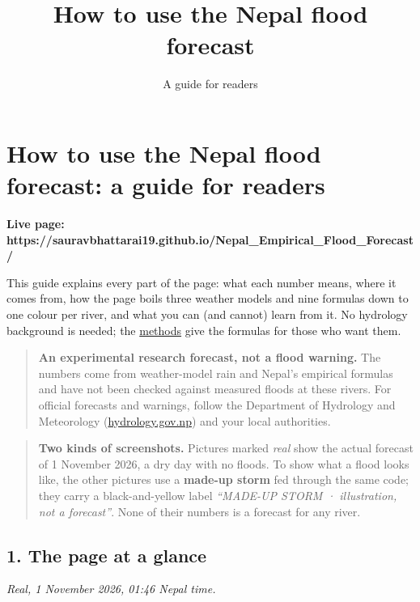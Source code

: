 \documentclass[
  10pt,
]{article}
\title{How to use the Nepal flood forecast}
\subtitle{A guide for readers}
\author{}
\date{}
\begin{document}
\maketitle

{
\hypersetup{linkcolor=}
\setcounter{tocdepth}{3}
\tableofcontents
}
\hypertarget{how-to-use-the-nepal-flood-forecast-a-guide-for-readers}{%
\section{How to use the Nepal flood forecast: a guide for
readers}\label{how-to-use-the-nepal-flood-forecast-a-guide-for-readers}}

\textbf{Live page:
https://sauravbhattarai19.github.io/Nepal\_Empirical\_Flood\_Forecast/}

This guide explains every part of the page: what each number means,
where it comes from, how the page boils three weather models and nine
formulas down to one colour per river, and what you can (and cannot)
learn from it. No hydrology background is needed; the
\href{methods.md}{methods} give the formulas for those who want them.

\begin{quote}
\textbf{An experimental research forecast, not a flood warning.} The
numbers come from weather-model rain and Nepal's empirical formulas and
have not been checked against measured floods at these rivers. For
official forecasts and warnings, follow the Department of Hydrology and
Meteorology (\href{https://www.hydrology.gov.np}{hydrology.gov.np}) and
your local authorities.
\end{quote}

\begin{quote}
\textbf{Two kinds of screenshots.} Pictures marked \emph{real} show the
actual forecast of 1 November 2026, a dry day with no floods. To show
what a flood looks like, the other pictures use a \textbf{made-up storm}
fed through the same code; they carry a black-and-yellow label
\emph{``MADE-UP STORM · illustration, not a forecast''}. None of their
numbers is a forecast for any river.
\end{quote}

\hypertarget{the-page-at-a-glance}{%
\subsection{1. The page at a glance}\label{the-page-at-a-glance}}

\emph{Real, 1 November 2026, 01:46 Nepal time.}
\end{document}

